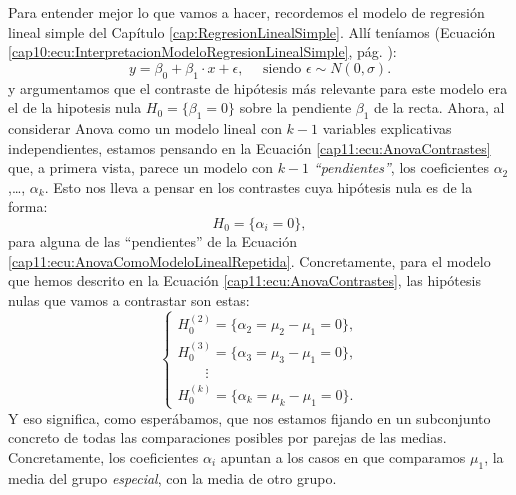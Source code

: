 Para entender mejor lo que vamos a hacer, recordemos el modelo de regresión lineal simple del Capítulo \ref{cap:RegresionLinealSimple}. Allí teníamos (Ecuación \ref{cap10:ecu:InterpretacionModeloRegresionLinealSimple}, pág. \pageref{cap10:ecu:InterpretacionModeloRegresionLinealSimple}):
    \[
        y=
        \beta_0 +\beta_1\cdot x+\epsilon,\quad\mbox{ siendo }\epsilon\sim N(0,\sigma).
    \]
y argumentamos que el contraste de hipótesis más relevante para este modelo era el de la hipotesis nula $H_0=\{\beta_1=0\}$ sobre la pendiente $\beta_1$ de la recta. Ahora, al considerar Anova como un modelo lineal con $k-1$ variables explicativas independientes, estamos pensando en la Ecuación \ref{cap11:ecu:AnovaContrastes}
que, a primera vista, parece un modelo con $k-1$ {\em ``pendientes''}, los coeficientes $\alpha_2$,\ldots, $\alpha_k$.  Esto nos lleva a pensar en los contrastes cuya hipótesis nula es de la forma:
\[H_0=\{\alpha_i=0\},\]
para alguna de las ``pendientes'' de la Ecuación \ref{cap11:ecu:AnovaComoModeloLinealRepetida}. Concretamente, para el modelo que hemos descrito en la Ecuación \ref{cap11:ecu:AnovaContrastes}, las hipótesis nulas que vamos a contrastar son estas:
\[
\begin{cases}
H_0^{(2)}=\{\alpha_2=\mu_2-\mu_1=0\},\\[2mm]
H_0^{(3)}=\{\alpha_3=\mu_3-\mu_1=0\},\\[2mm]
\qquad\vdots\\[2mm]
H_0^{(k)}=\{\alpha_k=\mu_k-\mu_1=0\}.
\end{cases}
\]
Y eso significa, como esperábamos, que nos estamos fijando en un subconjunto concreto de todas las comparaciones posibles por parejas de las medias.  Concretamente, los coeficientes $\alpha_i$ apuntan a los casos en que comparamos $\mu_1$, la media del grupo {\em especial}, con la media de otro grupo.

